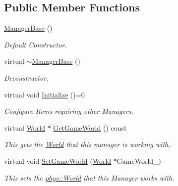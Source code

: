 \subsection*{Public Member Functions}
\begin{DoxyCompactItemize}
\item 
\hypertarget{classphys_1_1ManagerBase_a80c0d01d0dc19511cd08fc6ac805a616}{
\hyperlink{classphys_1_1ManagerBase_a80c0d01d0dc19511cd08fc6ac805a616}{ManagerBase} ()}
\label{d2/de3/classphys_1_1ManagerBase_a80c0d01d0dc19511cd08fc6ac805a616}

\begin{DoxyCompactList}\small\item\em Default Constructor. \item\end{DoxyCompactList}\item 
virtual \hyperlink{classphys_1_1ManagerBase_a802dace8381459637297e9a372bfdf0c}{$\sim$ManagerBase} ()
\begin{DoxyCompactList}\small\item\em Deconstructor. \item\end{DoxyCompactList}\item 
virtual void \hyperlink{classphys_1_1ManagerBase_a57dd8e54e767427d5bdcc86dc66d73ed}{Initialize} ()=0
\begin{DoxyCompactList}\small\item\em Configure Items requiring other Managers. \item\end{DoxyCompactList}\item 
virtual \hyperlink{classphys_1_1World}{World} $\ast$ \hyperlink{classphys_1_1ManagerBase_addfd62fbc444ca4c2aba40768d1b284e}{GetGameWorld} () const 
\begin{DoxyCompactList}\small\item\em This gets the \hyperlink{classphys_1_1World}{World} that this manager is working with. \item\end{DoxyCompactList}\item 
virtual void \hyperlink{classphys_1_1ManagerBase_a97eb1e77c1f7a0925fc623836368a262}{SetGameWorld} (\hyperlink{classphys_1_1World}{World} $\ast$GameWorld\_\-)
\begin{DoxyCompactList}\small\item\em This sets the \hyperlink{classphys_1_1World}{phys::World} that this Manager works with. \item\end{DoxyCompactList}\item 

\end{DoxyCompactItemize}
